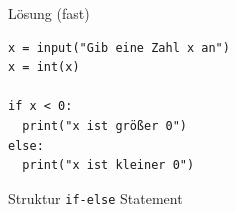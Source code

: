 \begin{fragile}
	
\begin{block}{Lösung \footnotesize(fast)}
\begin{verbatim}
x = input("Gib eine Zahl x an")
x = int(x)

if x < 0:
  print("x ist größer 0")
else:
  print("x ist kleiner 0")
\end{verbatim}
\end{block}
	
\end{fragile}


\begin{frame}


	\renewcommand{\baselinestretch}{1.5}
\begin{block}{Struktur \texttt{if-else} Statement}	
	\vspace{2pt}
\end{block}
\renewcommand{\baselinestretch}{1}

\end{frame}
